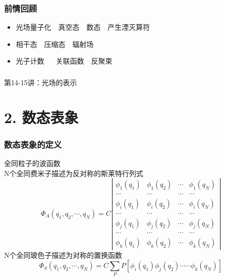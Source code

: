 \begin{frame}
    \frametitle{前情回顾}
    \begin{itemize}
        \item 光场量子化~~真空态~~数态~~产生湮灭算符 
        \item 相干态~~压缩态~~辐射场 
        \item 光子计数 ~~ 关联函数~~反聚束
    \end{itemize}     
\end{frame}

\begin{frame} [plain]
    \frametitle{}
    \Background[1] 
    \begin{center}
    {\huge 第14-15讲：光场的表示}
    \end{center}  
    \addtocounter{framenumber}{-1}   
\end{frame}

\section{2. 数态表象 }

\begin{frame} 
\frametitle{数态表象的定义}
{\Bullet}全同粒子的波函数 \\ 
   N个全同费米子描述为反对称的斯莱特行列式
   \[ \Phi_{A}\left(q_{1}, q_{2}, \cdots, q_{N}\right)=C\left|\begin{array}{cccc}
    \phi_{1}\left(q_{1}\right) & \phi_{1}\left(q_{2}\right) & \cdots & \phi_{1}\left(q_{N}\right) \\
    \cdots & \cdots & \cdots & \cdots \\
    \phi_{i}\left(q_{1}\right) & \phi_{i}\left(q_{2}\right) & \cdots & \phi_{i}\left(q_{N}\right) \\
    \cdots & \cdots & \cdots & \cdots \\
    \phi_{j}\left(q_{1}\right) & \phi_{j}\left(q_{2}\right) & \cdots & \phi_{j}\left(q_{N}\right) \\
    \cdots & \cdots & \cdots & \cdots \\
    \phi_{k}\left(q_{1}\right) & \phi_{k}\left(q_{2}\right) & \cdots & \phi_{k}\left(q_{N}\right)
    \end{array}\right|\]
    N个全同玻色子描述为对称的置换函数
    \[\Phi_{S}\left(q_{1}, q_{2}, \cdots, q_{N}\right)=C \sum_{P} P [\phi_{i}\left(q_{1}\right) \phi_{j}\left(q_{2}\right) \cdots \cdots \phi_{k}\left(q_{N}\right)] \]
\end{frame}

